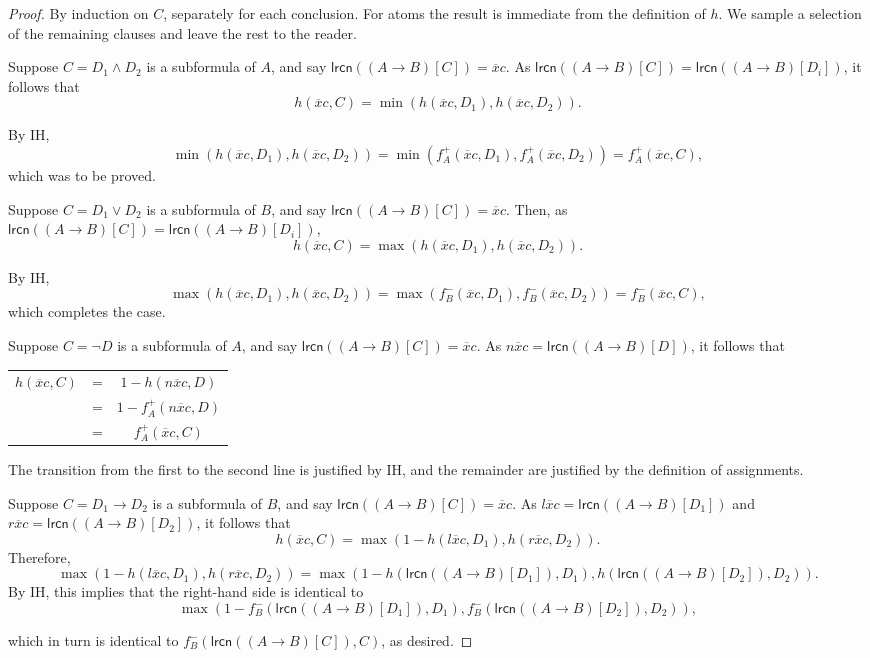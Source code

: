 \documentclass{amsart}
\theoremstyle{definition}
\newcommand{\lrcn}{\mathsf{lrcn}}
\begin{document}
\begin{proof}
    By induction on $C$, separately for each conclusion. For atoms the result is immediate from the definition of $h$. We sample a selection of the remaining clauses and leave the rest to the reader.

    Suppose $C=D_1\land D_2$ is a subformula of $A$, and say $\lrcn((A\to B)[C])=\overline{x}c$. As $\lrcn((A\to B)[C])=\lrcn((A\to B)[D_i])$,
    it follows that
    \[
    h(\overline{x}c,C)=\min(h(\overline{x}c,D_1), h(\overline{x}c,D_2)).
    \]
    
     By IH, 
    \[
    \min(h(\overline{x}c,D_1), h(\overline{x}c,D_2))=\min(f^+_A(\overline{x}c,D_1),f^+_A(\overline{x}c,D_2))=f^+_A(\overline{x}c,C),
    \]
    which was to be proved.

    Suppose $C=D_1\lor D_2$ is a subformula of $B$, and say $\lrcn((A\to B)[C])=\overline{x}c$. Then, as $\lrcn((A\to B)[C])=\lrcn((A\to B)[D_i])$,
    \[
    h(\overline{x}c,C)=\max(h(\overline{x}c,D_1), h(\overline{x}c,D_2)). 
    \]
    
    By IH,
    \[
    \max(h(\overline{x}c,D_1), h(\overline{x}c,D_2))=\max(f^-_B(\overline{x}c,D_1),f^-_B(\overline{x}c,D_2))=f^-_B(\overline{x}c,C),
    \]
    which completes the case.

    Suppose $C=\neg D$ is a subformula of $A$, and say $\lrcn((A\to B)[C])=\overline{x}c$. As $n\overline{x}c=\lrcn((A\to B)[D])$, it follows that
    \begin{center}
    \begin{tabular}{ccc}
    $h(\overline{x}c,C)$ & = &  $1-h(n\overline{x}c,D)$\\ 
    & =& $1-f^+_A(n\overline{x}c,D)$ \\ 
    & =& $f^+_A(\overline{x}c,C)$ \\ 
    \end{tabular}
    \end{center}
    The transition from the first to the second line is justified by IH, and the remainder are justified by the definition of assignments. 
    
    Suppose $C=D_1\to D_2$ is a subformula of $B$, and say $\lrcn((A\to B)[C])=\overline{x}c$. 
    As $l\overline{x}c=\lrcn((A\to B)[D_1])$ and $r\overline{x}c=\lrcn((A\to B)[D_2])$, it follows that 
    \[
    h(\overline{x}c,C)=\max(1-h(l\overline{x}c,D_1), h(r\overline{x}c,D_2)).
    \]
    Therefore, 
    \[
    \max(1-h(l\overline{x}c,D_1), h(r\overline{x}c,D_2))=\max(1-h(\lrcn((A\to B)[D_1]),D_1), h(\lrcn((A\to B)[D_2]),D_2)).
    \]
    By IH, this implies that the right-hand side is identical to
    \[
    \max(1-f^-_B(\lrcn((A\to B)[D_1]),D_1), f^-_B(\lrcn((A\to B)[D_2]),D_2)), 
    \]
    
    which in turn is identical to $f^-_B(\lrcn((A\to B)[C]),C)$,
    as desired.

\end{proof}
\end{document}
